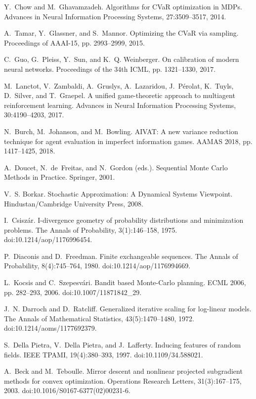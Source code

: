 \begin{thebibliography}{99}
Y.~Chow and M.~Ghavamzadeh.
Algorithms for CVaR optimization in MDPs.
Advances in Neural Information Processing Systems, 27:3509--3517, 2014.

A.~Tamar, Y.~Glassner, and S.~Mannor.
Optimizing the CVaR via sampling.
Proceedings of AAAI-15, pp. 2993--2999, 2015.

C.~Guo, G.~Pleiss, Y.~Sun, and K.~Q. Weinberger.
On calibration of modern neural networks.
Proceedings of the 34th ICML, pp. 1321--1330, 2017.

M.~Lanctot, V.~Zambaldi, A.~Gruslys, A.~Lazaridou, J.~P\'{e}rolat, K.~Tuyls, D.~Silver, and T.~Graepel.
A unified game-theoretic approach to multiagent reinforcement learning.
Advances in Neural Information Processing Systems, 30:4190--4203, 2017.

N.~Burch, M.~Johanson, and M.~Bowling.
AIVAT: A new variance reduction technique for agent evaluation in imperfect information games.
AAMAS 2018, pp. 1417--1425, 2018.

A.~Doucet, N.~de~Freitas, and N.~Gordon (eds.).
Sequential Monte Carlo Methods in Practice.
Springer, 2001.

V.~S. Borkar.
Stochastic Approximation: A Dynamical Systems Viewpoint.
Hindustan/Cambridge University Press, 2008.

I.~Csisz\'{a}r.
I-divergence geometry of probability distributions and minimization problems.
The Annals of Probability, 3(1):146--158, 1975. doi:10.1214/aop/1176996454.

P.~Diaconis and D.~Freedman.
Finite exchangeable sequences.
The Annals of Probability, 8(4):745--764, 1980. doi:10.1214/aop/1176994669.

L.~Kocsis and C.~Szepesv\'{a}ri.
Bandit based Monte-Carlo planning.
ECML 2006, pp. 282--293, 2006. doi:10.1007/11871842\_29.

J.~N. Darroch and D.~Ratcliff.
Generalized iterative scaling for log-linear models.
The Annals of Mathematical Statistics, 43(5):1470--1480, 1972. doi:10.1214/aoms/1177692379.

S.~Della Pietra, V.~Della Pietra, and J.~Lafferty.
Inducing features of random fields.
IEEE TPAMI, 19(4):380--393, 1997. doi:10.1109/34.588021.

A.~Beck and M.~Teboulle.
Mirror descent and nonlinear projected subgradient methods for convex optimization.
Operations Research Letters, 31(3):167--175, 2003. doi:10.1016/S0167-6377(02)00231-6.


\end{thebibliography}
